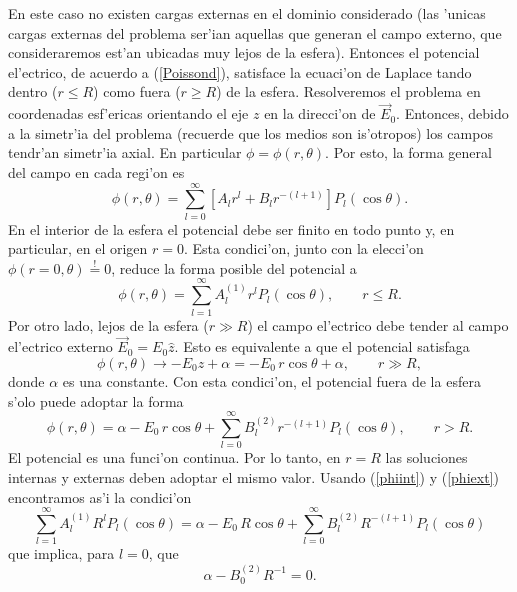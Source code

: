 En este caso no existen cargas externas en el dominio considerado (las 'unicas cargas externas del problema ser'ian aquellas que generan el campo externo, que consideraremos est'an ubicadas muy lejos de la esfera). Entonces el potencial el'ectrico, de acuerdo a (\ref{Poissond}), satisface la ecuaci'on de Laplace tando dentro ($r\le R$) como fuera ($r\ge R$) de la esfera. Resolveremos el problema en coordenadas esf'ericas orientando el eje $z$ en la direcci'on de $\vec{E}_0$. Entonces, debido a la simetr'ia del problema (recuerde que los medios son is'otropos) los campos tendr'an simetr'ia axial. En particular $\phi=\phi(r,\theta)$. Por esto, la forma general del campo en cada regi'on es
 \begin{equation}
 \phi(r,\theta)=\sum_{l=0}^{\infty}\left[  A_lr^{l}+B_lr^{-(l+1)}\right]
 P_l(\cos\theta).
 \end{equation}
En el interior de la esfera el potencial debe ser finito en todo punto y, en particular, en el origen $r=0$. Esta condici'on, junto con la elecci'on $\phi (r=0,\theta)\stackrel{!}{=}0$, reduce la forma posible del potencial a 
 \begin{equation}\label{phiint}
 \phi(r,\theta)=\sum_{l=1}^{\infty}A_l^{(1)}r^{l}P_l(\cos\theta), \qquad r\le R.
 \end{equation}
Por otro lado, lejos de la esfera ($r\gg R$) el campo el'ectrico debe tender al campo el'ectrico externo $\vec{E}_0=E_0\hat{z}$. Esto es equivalente a que el potencial satisfaga
\begin{equation}
 \phi(r,\theta)\to -E_0z+\alpha = -E_0\,r\cos\theta+\alpha, \qquad r\gg R,
\end{equation}
donde $\alpha$ es una constante. Con esta condici'on, el potencial fuera de la esfera s'olo puede adoptar la forma
\begin{equation}\label{phiext}
\phi(r,\theta)=\alpha-E_0\,r\cos\theta+\sum_{l=0}^{\infty}B_l^{(2)}
 r^{-(l+1)}P_l(\cos\theta), \qquad r>R.
\end{equation}
El potencial es una funci'on continua. Por lo tanto, en $r=R$ las soluciones internas y externas deben adoptar el mismo valor. Usando (\ref{phiint}) y (\ref{phiext}) encontramos as'i la condici'on
 \begin{equation}
 \sum_{l=1}^{\infty}A_l^{(1)}R^{l}P_l(\cos\theta)  
 =\alpha-E_0\,R\cos\theta+\sum_{l=0}^{\infty}B_l^{(2)}R^{-(l+1)} P_l(\cos\theta)
 \end{equation}
 que implica, para $l=0$, que
\begin{equation}\label{ecl0a}
\alpha-B_0^{(2)}R^{-1}=0.
\end{equation}

